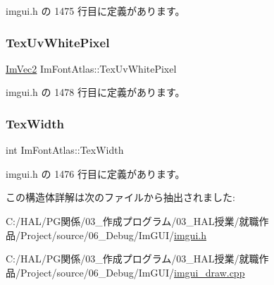  imgui.\+h の 1475 行目に定義があります。

\mbox{\label{struct_im_font_atlas_af1d05221e9a1607d7f625df92a4f9b7e}} 
\subsubsection{\texorpdfstring{Tex\+Uv\+White\+Pixel}{TexUvWhitePixel}}
{\footnotesize\ttfamily \mbox{\hyperlink{struct_im_vec2}{Im\+Vec2}} Im\+Font\+Atlas\+::\+Tex\+Uv\+White\+Pixel}



 imgui.\+h の 1478 行目に定義があります。

\mbox{\label{struct_im_font_atlas_a2d0662502433e7a87b3aa4681ba17aa3}} 
\subsubsection{\texorpdfstring{Tex\+Width}{TexWidth}}
{\footnotesize\ttfamily int Im\+Font\+Atlas\+::\+Tex\+Width}



 imgui.\+h の 1476 行目に定義があります。



この構造体詳解は次のファイルから抽出されました\+:\begin{DoxyCompactItemize}
\item 
C\+:/\+H\+A\+L/\+P\+G関係/03\+\_\+作成プログラム/03\+\_\+\+H\+A\+L授業/就職作品/\+Project/source/06\+\_\+\+Debug/\+Im\+G\+U\+I/\mbox{\hyperlink{imgui_8h}{imgui.\+h}}\item 
C\+:/\+H\+A\+L/\+P\+G関係/03\+\_\+作成プログラム/03\+\_\+\+H\+A\+L授業/就職作品/\+Project/source/06\+\_\+\+Debug/\+Im\+G\+U\+I/\mbox{\hyperlink{imgui__draw_8cpp}{imgui\+\_\+draw.\+cpp}}\end{DoxyCompactItemize}
